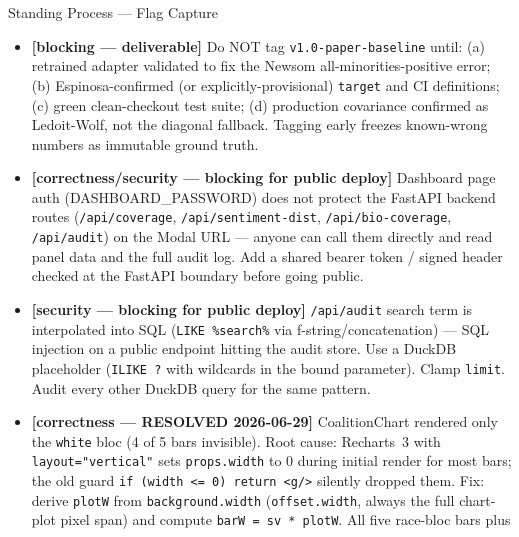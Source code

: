 \documentclass[11pt]{article}
\begin{document}
\begin{taskbox}{Standing Process --- Flag Capture}
{\begin{itemize}[leftmargin=1.6em, itemsep=1pt]
      Results sections are scaffolded, not written --- 39
      TODO/PROVISIONAL placeholders, each tied to a real output
      (Espinosa decision, paper\_baseline run, or model validation). None
      may be filled from memory or assumption. Submission gate:
      \texttt{grep -c 'TODO\textbackslash{}|PROVISIONAL'} on the paper
      must return 0. Load-bearing holes: contested $V_{eq}$ (0.535
      vs 0.5066), synthetic-data admissibility, Newsom directional
      validation.
    \item[$\square$] \textbf{[blocking --- deliverable]} Do NOT tag
      \texttt{v1.0-paper-baseline} until: (a) retrained adapter validated
      to fix the Newsom all-minorities-positive error; (b)
      Espinosa-confirmed (or explicitly-provisional) \texttt{target} and
      CI definitions; (c) green clean-checkout test suite; (d) production
      covariance confirmed as Ledoit-Wolf, not the diagonal fallback.
      Tagging early freezes known-wrong numbers as immutable ground truth.
    \item[$\square$] \textbf{[correctness/security --- blocking for public
      deploy]} Dashboard page auth (DASHBOARD\_PASSWORD) does not protect
      the FastAPI backend routes (\texttt{/api/coverage},
      \texttt{/api/sentiment-dist}, \texttt{/api/bio-coverage},
      \texttt{/api/audit}) on the Modal URL --- anyone can call them
      directly and read panel data and the full audit log. Add a shared
      bearer token / signed header checked at the FastAPI boundary before
      going public.
    \item[$\square$] \textbf{[security --- blocking for public deploy]}
      \texttt{/api/audit} search term is interpolated into SQL
      (\texttt{LIKE \%search\%} via f-string/concatenation) --- SQL
      injection on a public endpoint hitting the audit store. Use a
      DuckDB placeholder (\texttt{ILIKE ?} with wildcards in the bound
      parameter). Clamp \texttt{limit}. Audit every other DuckDB query
      for the same pattern.
    \item[$\boxtimes$] \textbf{[correctness --- RESOLVED 2026-06-29]}
      CoalitionChart rendered only the \texttt{white} bloc (4 of 5 bars
      invisible). Root cause: Recharts~3 with \texttt{layout="vertical"}
      sets \texttt{props.width} to 0 during initial render for most bars;
      the old guard \texttt{if (width <= 0) return <g/>} silently dropped
      them. Fix: derive \texttt{plotW} from \texttt{background.width}
      (\texttt{offset.width}, always the full chart-plot pixel span) and
      compute \texttt{barW = sv * plotW}. All five race-bloc bars plus

\end{itemize}}
\end{taskbox}
\end{document}
